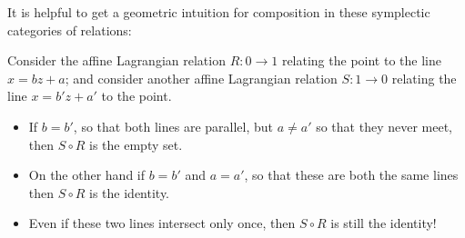 It is helpful to get a geometric intuition for composition in these symplectic categories of relations:
\begin{example}
  Consider the affine Lagrangian relation \(R:0\to 1\) relating the point to the line \(x=bz+a\); and consider another affine Lagrangian relation \(S:1\to 0\) relating the line \(x=b'z+a'\) to the point.
  \begin{itemize}
    \item
    If \(b=b'\), so that both lines are parallel, but \(a\neq a'\) so that they never meet, then \(S\circ R\) is the empty set.
    \item
    On the other hand if \(b=b'\) and \(a=a'\), so that these are both the same lines then  \(S\circ R\)  is the identity.
    \item
    Even if these two lines intersect only once, then \(S\circ R\) is still the identity!
  \end{itemize}
\end{example}
